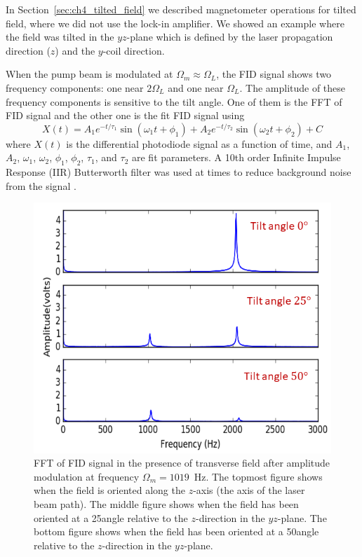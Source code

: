 
In Section~\ref{sec:ch4_tilted_field} we described magnetometer
operations for tilted field, where we did not use the lock-in
amplifier.  We showed an example where the field was tilted in the
$yz$-plane which is defined by the laser propagation direction ($z$)
and the $y$-coil direction.

When the pump beam is modulated at $\Omega_m\approx \Omega_L$, the FID
signal shows two frequency components: one near $2\Omega_L$ and one
near $\Omega_L$.  The amplitude of these frequency components is
sensitive to the tilt angle. One of them is the FFT of FID signal and
the other one is the fit FID signal using
\begin{equation}
  X(t)=A_1e^{-t/\tau_1}\sin(\omega_1t+\phi_1)+A_2e^{-t/\tau_2}\sin(\omega_2t+\phi_2)+C
\label{eq:two_sinewave}
\end{equation}
where $X(t)$ is the differential photodiode signal as a function of
time, and $A_1$, $A_2$, $\omega_1$, $\omega_2$, $\phi_1$, $\phi_2$,
$\tau_1$, and $\tau_2$ are fit parameters.  A 10th order Infinite
Impulse Response (IIR) Butterworth filter was used at times to reduce
background noise from the signal \cite{key}.

\begin{figure}%
\centering\includegraphics[width=0.7\linewidth]{figures/fft_amp.png}
\caption{FFT of FID signal in the presence of transverse field after
  amplitude modulation at frequency $\Omega_m=1019$~Hz.  The topmost
  figure shows when the field is oriented along the $z$-axis (the axis
  of the laser beam path).  The middle figure shows when the field has
  been oriented at a 25\degree angle relative to the $z$-direction in
  the $yz$-plane.  The bottom figure shows when the field has been
  oriented at a 50\degree angle relative to the $z$-direction in the
  $yz$-plane.\label{fig:fft-amplitude}}
\end{figure}

